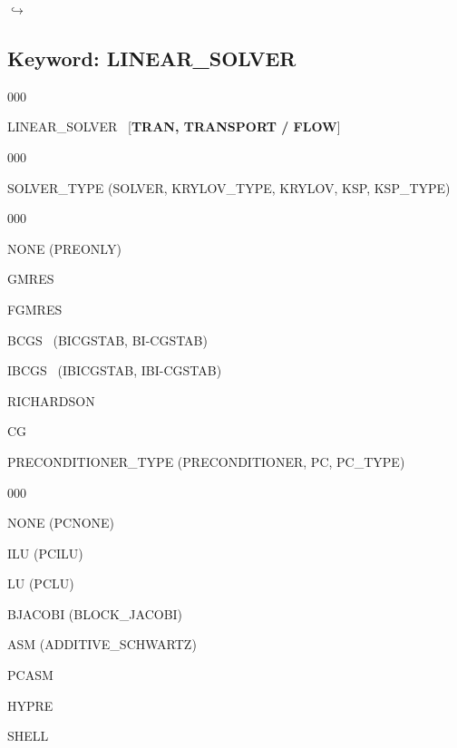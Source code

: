 \documentclass[12pt]{article}
\newcommand\return{{\hfill$\hookrightarrow$}}
\begin{document}
\hyperlink{target_key}{\return}


\newpage
\protect\hypertarget{target_linsolv}{}

\subsection{Keyword: LINEAR\_SOLVER}


\begin{deflist}{000}
\item[LINEAR\_SOLVER] \ [{\bf TRAN, TRANSPORT / FLOW}]

\begin{deflist}{000}
\item[SOLVER\_TYPE (SOLVER, KRYLOV\_TYPE, KRYLOV, KSP, KSP\_TYPE)] ~

\begin{deflist}{000}
\item[NONE (PREONLY)]
\item[GMRES]
\item[FGMRES]
\item[BCGS] \ (BICGSTAB, BI-CGSTAB)
\item[IBCGS] \ (IBICGSTAB, IBI-CGSTAB)
\item[RICHARDSON]
\item[CG]
\end{deflist}

\item[PRECONDITIONER\_TYPE (PRECONDITIONER, PC, PC\_TYPE)] ~

\begin{deflist}{000}
\item[NONE (PCNONE)]
\item[ILU (PCILU)]
\item[LU (PCLU)]
\item[BJACOBI (BLOCK\_JACOBI)]
\item[ASM (ADDITIVE\_SCHWARTZ)]
\item[PCASM]
\item[HYPRE]
\item[SHELL]
\end{deflist}


\end{deflist}
\end{deflist}
\end{document}
